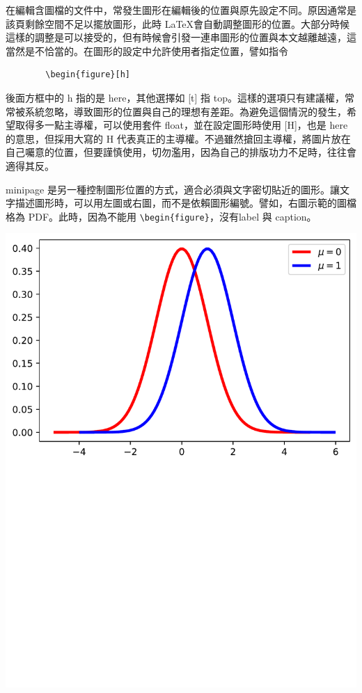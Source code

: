 \documentclass[12pt, a4paper]{article}
\begin{document}
在編輯含圖檔的文件中，常發生圖形在編輯後的位置與原先設定不同。原因通常是該頁剩餘空間不足以擺放圖形，此時 \LaTeX 會自動調整圖形的位置。大部分時候這樣的調整是可以接受的，但有時候會引發一連串圖形的位置與本文越離越遠，這當然是不恰當的。在圖形的設定中允許使用者指定位置，譬如指令

\bigskip
	\begin{lstlisting}
		\begin{figure}[h]
	\end{lstlisting}
\bigskip
後面方框中的 h 指的是 here，其他選擇如  [t] 指 top。這樣的選項只有建議權，常常被系統忽略，導致圖形的位置與自己的理想有差距。為避免這個情況的發生，希望取得多一點主導權，可以使用套件 float，並在設定圖形時使用  [H]，也是 here 的意思，但採用大寫的  H 代表真正的主導權。不過雖然搶回主導權，將圖片放在自己囑意的位置，但要謹慎使用，切勿濫用，因為自己的排版功力不足時，往往會適得其反。

\begin{minipage}{.4\linewidth}
{\A minipage} 是另一種控制圖形位置的方式，適合必須與文字密切貼近的圖形。讓文字描述圖形時，可以用左圖或右圖，而不是依賴圖形編號。譬如，右圖示範的圖檔格為 PDF。此時，因為不能用 \verb|\begin{figure}|，沒有{\A label} 與  {\A caption}。

\end{minipage}
\begin{minipage}{.6\linewidth}
        \includegraphics[scale=0.3]{test.pdf}
\end{minipage}
\end{document}
